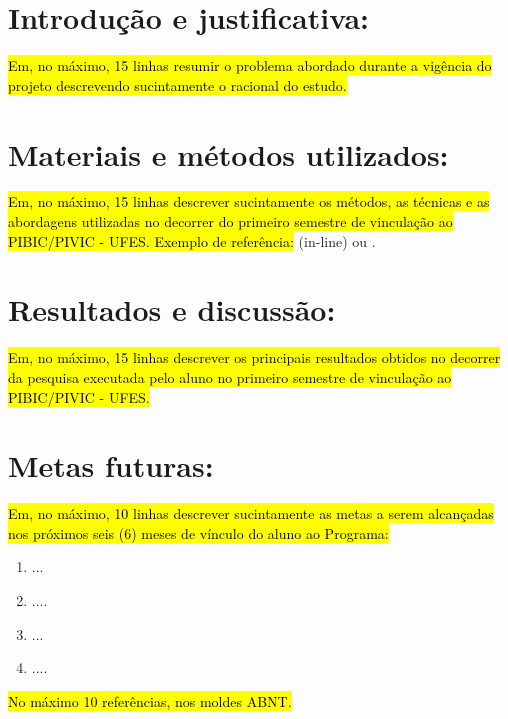 \documentclass[10pt, a4paper]{article}
\begin{document}
\clearpage




\section*{Introdução e justificativa:}
\label{sec-intro}

\hl{Em, no máximo, 15 linhas resumir o problema abordado durante a vigência do projeto descrevendo sucintamente o racional do estudo.}




\section*{Materiais e métodos utilizados:}

\hl{Em, no máximo, 15 linhas descrever sucintamente os métodos, as técnicas e as abordagens utilizadas no decorrer do primeiro semestre de vinculação ao PIBIC/PIVIC - UFES. Exemplo de referência:} \cite{guarino-et-al:hobook09} (in-line) ou \citep{guarino-et-al:hobook09}.




\section*{Resultados e discussão:}

\hl{Em, no máximo, 15 linhas descrever os principais resultados obtidos no decorrer da pesquisa executada pelo aluno no primeiro semestre de vinculação ao PIBIC/PIVIC - UFES.}




\section*{Metas futuras:}

\hl{Em, no máximo, 10 linhas descrever sucintamente as metas a serem alcançadas nos próximos seis (6)  meses de vínculo do aluno ao Programa:}
\begin{enumerate}
	\item ...
	
	\item ....
	
	\item ...
	
	\item ....
\end{enumerate}





\hl{No máximo 10 referências, nos moldes ABNT.}


\end{document}
